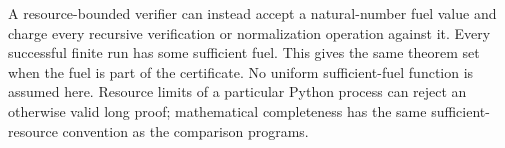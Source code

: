 A resource-bounded verifier can instead accept a natural-number fuel value
and charge every recursive verification or normalization operation against
it.  Every successful finite run has some sufficient fuel.  This gives the
same theorem set when the fuel is part of the certificate.  No uniform
sufficient-fuel function is assumed here.  Resource limits of a particular
Python process can reject an otherwise valid long proof; mathematical
completeness has the same sufficient-resource convention as the comparison
programs.

